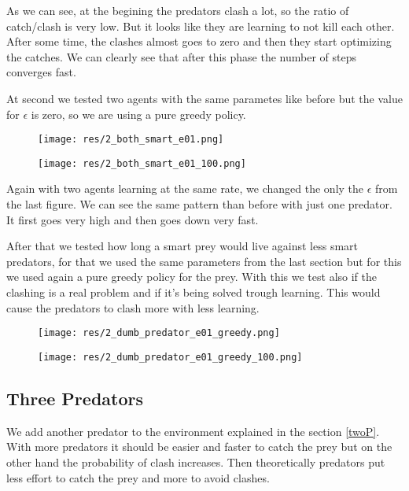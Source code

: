 \documentclass{article}
\begin{document}
As we can see, at the begining the predators clash a lot, so the ratio of
catch/clash is very low. But it looks like they are learning to not kill each
other. After some time, the clashes almost goes to zero and then they start
optimizing the catches. We can clearly see that after this phase the number of
steps converges fast.


At second we tested two agents with the same parametes like before but the value
for $\epsilon$ is zero, so we are using a pure greedy policy.

\begin{figure}[htbp]
	\centering
	\begin{minipage}[t]{.45\linewidth}
		\centering
		\texttt{[image: res/2\_both\_smart\_e01.png]}
	\end{minipage}
	\begin{minipage}[t]{.45\linewidth}
		\centering
		\texttt{[image: res/2\_both\_smart\_e01\_100.png]}
	\end{minipage}
\end{figure}

Again with two agents learning at the same rate, we changed the only the
$\epsilon$ from the last figure. We can see the same pattern than before with
just one predator. It first goes very high and then goes down very fast.

After that we tested how long a smart prey would live against less smart
predators, for that we used the same parameters from the last section but for
this we used again a pure greedy policy for the prey.
With this we test also if the clashing is a real problem and if it's being solved
trough learning. This would cause the predators to clash more with less
learning. 

\begin{figure}[htbp]
	\centering
	\begin{minipage}[t]{.45\linewidth}
		\centering
		\texttt{[image: res/2\_dumb\_predator\_e01\_greedy.png]}
	\end{minipage}
	\begin{minipage}[t]{.45\linewidth}
		\centering
		\texttt{[image: res/2\_dumb\_predator\_e01\_greedy\_100.png]}
	\end{minipage}
\end{figure}



\subsection{Three Predators}
We add another predator to the environment explained in the section \ref{twoP}.
With more predators it should be easier and faster to catch the prey but on the
other hand the probability of clash increases. Then theoretically predators put
less effort to catch the prey and more to avoid clashes.
\end{document}

